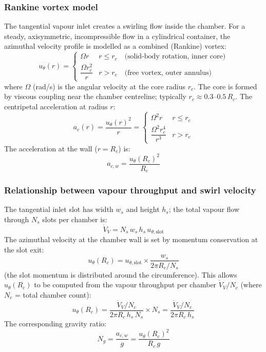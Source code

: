 \documentclass[11pt,letterpaper]{article}
\newcommand{\utheta}{u_{\theta}}
\newcommand{\Rc}{R_c}
\begin{document}
\subsubsection{Rankine vortex model}

The tangential vapour inlet creates a swirling flow inside the chamber.
For a steady, axisymmetric, incompressible flow in a cylindrical container,
the azimuthal velocity profile is modelled as a combined (Rankine) vortex:
\begin{equation}
  \utheta(r) =
  \begin{cases}
    \Omega r & r \leq r_c \quad\text{(solid-body rotation, inner core)}\\
    \dfrac{\Omega r_c^2}{r} & r > r_c \quad\text{(free vortex, outer annulus)}
  \end{cases}
  \label{eq:rankine}
\end{equation}
where $\Omega$ (rad/s) is the angular velocity at the core radius $r_c$.
The core is formed by viscous coupling near the chamber centreline; typically
$r_c \approx 0.3$--$0.5\,\Rc$.  The centripetal acceleration at radius $r$:
\begin{equation}
  a_c(r) = \frac{\utheta(r)^2}{r}
  =
  \begin{cases}
    \Omega^2 r & r \leq r_c \\
    \dfrac{\Omega^2 r_c^4}{r^3} & r > r_c
  \end{cases}
  \label{eq:centripetal}
\end{equation}
The acceleration at the wall ($r = \Rc$) is:
\begin{equation}
  a_{c,w} = \frac{\utheta(\Rc)^2}{\Rc}
  \label{eq:ac_wall}
\end{equation}

\subsubsection{Relationship between vapour throughput and swirl velocity}

The tangential inlet slot has width $w_s$ and height $h_s$; the total
vapour flow through $N_s$ slots per chamber is:
\begin{equation}
  \dot{V}_V = N_s\,w_s\,h_s\,u_{\theta,\mathrm{slot}}
  \label{eq:vdot_slot}
\end{equation}
The azimuthal velocity at the chamber wall is set by momentum conservation
at the slot exit:
\begin{equation}
  \utheta(\Rc) = u_{\theta,\mathrm{slot}}\times\frac{w_s}{2\pi\Rc/N_s}
  \label{eq:utheta_wall}
\end{equation}
(the slot momentum is distributed around the circumference).  This allows
$\utheta(\Rc)$ to be computed from the vapour throughput per chamber
$\dot{V}_V/N_c$ (where $N_c$ = total chamber count):
\begin{equation}
  \utheta(\Rc) =
  \frac{\dot{V}_V/N_c}{2\pi\Rc\,h_s\,N_s}\times N_s
  = \frac{\dot{V}_V/N_c}{2\pi\Rc\,h_s}
  \label{eq:utheta_from_vdot}
\end{equation}
The corresponding gravity ratio:
\begin{equation}
  N_g = \frac{a_{c,w}}{g} = \frac{\utheta(\Rc)^2}{\Rc\,g}
  \label{eq:Ng}
\end{equation}
\end{document}
